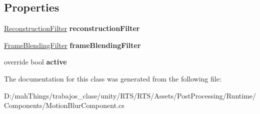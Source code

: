 \subsection*{Properties}
\begin{DoxyCompactItemize}
\item 
\mbox{\label{class_unity_engine_1_1_post_processing_1_1_motion_blur_component_aea13feeae21a2323a05a78650f761594}} 
\mbox{\hyperlink{class_unity_engine_1_1_post_processing_1_1_motion_blur_component_1_1_reconstruction_filter}{Reconstruction\+Filter}} {\bfseries reconstruction\+Filter}
\item 
\mbox{\label{class_unity_engine_1_1_post_processing_1_1_motion_blur_component_a21f0734301f3bd60e1454df1540c3a79}} 
\mbox{\hyperlink{class_unity_engine_1_1_post_processing_1_1_motion_blur_component_1_1_frame_blending_filter}{Frame\+Blending\+Filter}} {\bfseries frame\+Blending\+Filter}
\item 
\mbox{\label{class_unity_engine_1_1_post_processing_1_1_motion_blur_component_aef85ae6ce557465b097ed27e23f0a27e}} 
override bool {\bfseries active}
\end{DoxyCompactItemize}


The documentation for this class was generated from the following file\+:\begin{DoxyCompactItemize}
\item 
D\+:/mah\+Things/trabajos\+\_\+clase/unity/\+R\+T\+S/\+R\+T\+S/\+Assets/\+Post\+Processing/\+Runtime/\+Components/Motion\+Blur\+Component.\+cs\end{DoxyCompactItemize}
